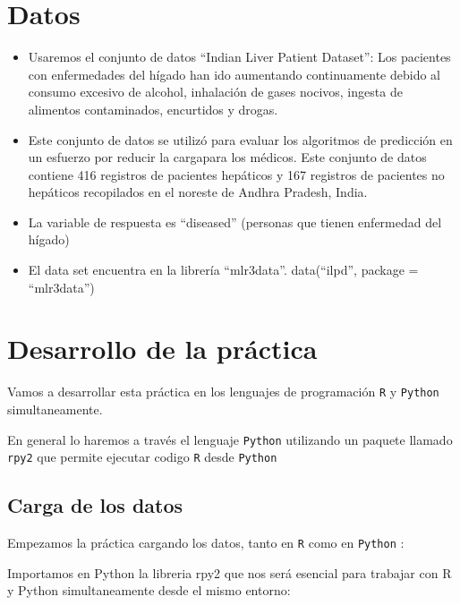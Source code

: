 \documentclass[
  11pt,
  a4paper,
]{article}
\begin{document}
\hypertarget{datos}{%
\section{\texorpdfstring{Datos }{Datos }}\label{datos}}

\begin{itemize}
\item
  Usaremos el conjunto de datos ``Indian Liver Patient Dataset'': Los
  pacientes con enfermedades del hígado han ido aumentando continuamente
  debido al consumo excesivo de alcohol, inhalación de gases nocivos,
  ingesta de alimentos contaminados, encurtidos y drogas.
\item
  Este conjunto de datos se utilizó para evaluar los algoritmos de
  predicción en un esfuerzo por reducir la cargapara los médicos. Este
  conjunto de datos contiene 416 registros de pacientes hepáticos y 167
  registros de pacientes no hepáticos recopilados en el noreste de
  Andhra Pradesh, India.
\item
  La variable de respuesta es ``diseased'' (personas que tienen
  enfermedad del hígado)
\item
  El data set encuentra en la librería ``mlr3data''. data(``ilpd'',
  package = ``mlr3data'')
\end{itemize}

\newpage

\hypertarget{desarrollo-de-la-pruxe1ctica}{%
\section{\texorpdfstring{Desarrollo de la práctica
}{Desarrollo de la práctica }}\label{desarrollo-de-la-pruxe1ctica}}

Vamos a desarrollar esta práctica en los lenguajes de programación
\texttt{R} y \texttt{Python} simultaneamente.

En general lo haremos a través el lenguaje \texttt{Python} utilizando un
paquete llamado \texttt{rpy2} que permite ejecutar codigo \texttt{R}
desde \texttt{Python}

\hypertarget{carga-de-los-datos}{%
\subsection{Carga de los datos}\label{carga-de-los-datos}}

Empezamos la práctica cargando los datos, tanto en \texttt{R} como en
\texttt{Python} :

Importamos en Python la libreria rpy2 que nos será esencial para
trabajar con R y Python simultaneamente desde el mismo entorno:
\end{document}

